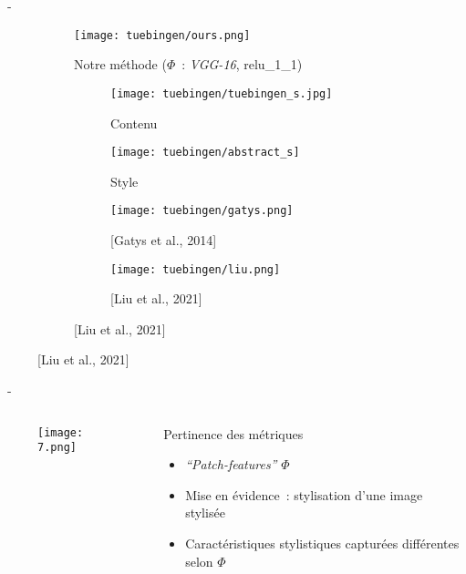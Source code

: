 \documentclass[aspectratio=169, 22pt]{beamer}
\begin{document}
\begin{frame}{\secname~- \subsecname}
  \begin{figure}
    \begin{subfigure}{0.47\linewidth}
      \texttt{[image: tuebingen/ours.png]}
      \caption{Notre méthode ($\Phi$ : \emph{VGG-16}, relu\_1\_1)}
    \end{subfigure}
    \begin{subfigure}{0.45\linewidth}
      \begin{subfigure}{0.45\linewidth}
        \texttt{[image: tuebingen/tuebingen\_s.jpg]}
        \caption{Contenu}
      \end{subfigure}
      \begin{subfigure}{0.45\linewidth}
        \texttt{[image: tuebingen/abstract\_s]}
        \caption{Style}
      \end{subfigure}

      \begin{subfigure}{0.45\linewidth}
        \texttt{[image: tuebingen/gatys.png]}
        \caption{[Gatys et al., 2014]}
      \end{subfigure}
      \begin{subfigure}{0.45\linewidth}
        \texttt{[image: tuebingen/liu.png]}
        \caption{[Liu et al., 2021]}
      \end{subfigure}
    \end{subfigure}
  \end{figure}
\end{frame}


\begin{frame}{\secname~- \subsecname}
  \begin{columns}
    \begin{column}{0.5\linewidth}
      \begin{figure}
        \centering
        \texttt{[image: 7.png]}
      \end{figure}
    \end{column}
    \begin{column}{0.5\linewidth}
      \begin{block}{Pertinence des métriques}
        \begin{itemize}
        \item \emph{``Patch-features''} $\Phi$
        \item Mise en évidence : stylisation d'une image stylisée
        \item Caractéristiques stylistiques capturées différentes selon $\Phi$
        \end{itemize}
      \end{block}
    \end{column}
  \end{columns}
\end{frame}
\end{document}
